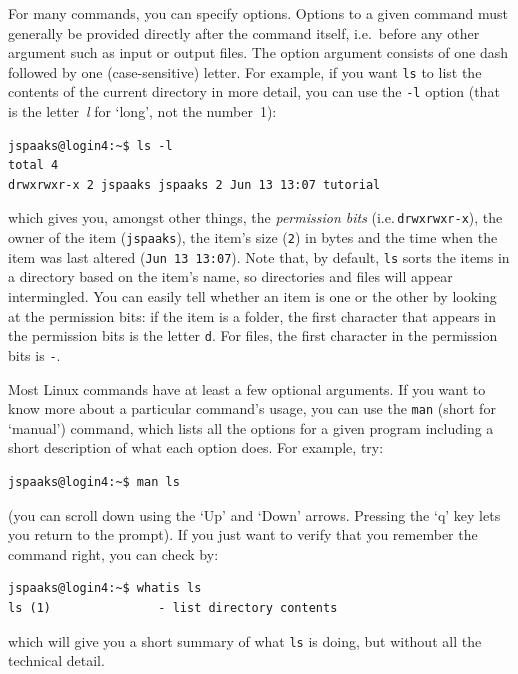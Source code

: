 For many commands, you can specify options. Options to a given command must generally be provided directly after the command itself, i.e.~before any other argument such as input or output files.  The option argument consists of one dash followed by one (case-sensitive) letter. For example, if you want \texttt{ls} to list the contents of the current directory in more detail, you can use the \texttt{-l} option (that is the letter~\textit{l} for `long', not the number~1):
\begin{lstlisting}[style=basic,style=bash]
jspaaks@login4:~$ ls -l
total 4
drwxrwxr-x 2 jspaaks jspaaks 2 Jun 13 13:07 tutorial
\end{lstlisting}
which gives you, amongst other things, the \textit{permission bits} (i.e.\,\lstinline{drwxrwxr-x}), the owner of the item (\lstinline{jspaaks}), the item's size (\lstinline{2}) in bytes and the time when the item was last altered (\lstinline{Jun 13 13:07}). Note that, by default, \lstinline[style=bashinline]{ls} sorts the items in a directory based on the item's name, so directories and files will appear intermingled. You can easily tell whether an item is one or the other by looking at the permission bits: if the item is a folder, the first character that appears in the permission bits is the letter \lstinline[style=bashinline]{d}. For files, the first character in the permission bits is \lstinline[style=bashinline]{-}.

Most Linux commands have at least a few optional arguments. If you want to know more about a particular command's usage, you can use the \texttt{man} (short for `manual') command, which lists all the options for a given program including a short description of what each option does. For example, try:
\begin{lstlisting}[style=basic,style=bash]
jspaaks@login4:~$ man ls
\end{lstlisting}
(you can scroll down using the `Up' and `Down' arrows. Pressing the `q' key lets you return to the prompt). If you just want to verify that you remember the command right, you can check by: 
\begin{lstlisting}[style=basic,style=bash]
jspaaks@login4:~$ whatis ls
ls (1)               - list directory contents
\end{lstlisting}
which will give you a short summary of what \lstinline{ls} is doing, but without all the technical detail.

